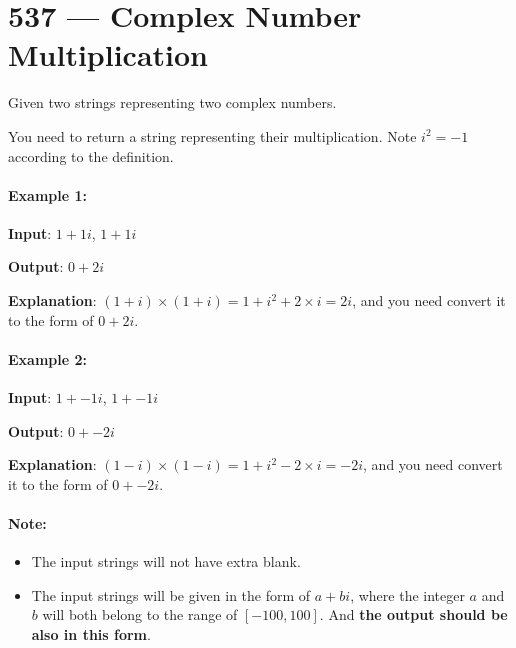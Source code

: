 \section{537 --- Complex Number Multiplication}
Given two strings representing two complex numbers.

You need to return a string representing their multiplication. Note $i^2 = -1$ according to the definition.

\paragraph{Example 1:}

\begin{flushleft}
\textbf{Input}: $1+1i$, $1+1i$

\textbf{Output}: $0+2i$

\textbf{Explanation}: $(1 + i) \times (1 + i) = 1 + i^2 + 2 \times i = 2i$, and you need convert it to the form of $0+2i$.

\end{flushleft}

\paragraph{Example 2:}

\begin{flushleft}
\textbf{Input}: $1+-1i$, $1+-1i$

\textbf{Output}: $0+-2i$

\textbf{Explanation}: $(1 - i) \times (1 - i) = 1 + i^2 - 2 \times i = -2i$, and you need convert it to the form of $0+-2i$.
\end{flushleft}

\paragraph{Note:}

\begin{itemize}
\item The input strings will not have extra blank.
\item The input strings will be given in the form of $a+bi$, where the integer $a$ and $b$ will both belong to the range of $[-100, 100]$. And \textbf{the output should be also in this form}.

\end{itemize}